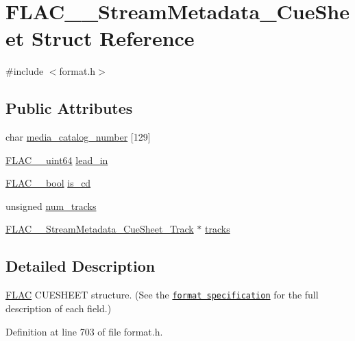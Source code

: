 \hypertarget{struct_f_l_a_c_____stream_metadata___cue_sheet}{}\section{F\+L\+A\+C\+\_\+\+\_\+\+Stream\+Metadata\+\_\+\+Cue\+Sheet Struct Reference}
\label{struct_f_l_a_c_____stream_metadata___cue_sheet}


{\ttfamily \#include $<$format.\+h$>$}

\subsection*{Public Attributes}
\begin{DoxyCompactItemize}
\item 
char \hyperlink{struct_f_l_a_c_____stream_metadata___cue_sheet_a776e6057ac7939fba52edecd44ec45bc}{media\+\_\+catalog\+\_\+number} \mbox{[}129\mbox{]}
\item 
\hyperlink{ordinals_8h_aa78c8c70a3eb8a58af7436f278acde8e}{F\+L\+A\+C\+\_\+\+\_\+uint64} \hyperlink{struct_f_l_a_c_____stream_metadata___cue_sheet_a43fdc0a538ef2c3e0926ee22814baf40}{lead\+\_\+in}
\item 
\hyperlink{ordinals_8h_a95103469f1cbd78b8cf250194985b34e}{F\+L\+A\+C\+\_\+\+\_\+bool} \hyperlink{struct_f_l_a_c_____stream_metadata___cue_sheet_a6af66f921aefc6f779fbc0ab6daeab8a}{is\+\_\+cd}
\item 
unsigned \hyperlink{struct_f_l_a_c_____stream_metadata___cue_sheet_a6924f26a8e8fa9023f23539b959fe2ae}{num\+\_\+tracks}
\item 
\hyperlink{struct_f_l_a_c_____stream_metadata___cue_sheet___track}{F\+L\+A\+C\+\_\+\+\_\+\+Stream\+Metadata\+\_\+\+Cue\+Sheet\+\_\+\+Track} $\ast$ \hyperlink{struct_f_l_a_c_____stream_metadata___cue_sheet_a5c0c3440b01b773684d56aeb1e424fab}{tracks}
\end{DoxyCompactItemize}


\subsection{Detailed Description}
\hyperlink{namespace_f_l_a_c}{F\+L\+AC} C\+U\+E\+S\+H\+E\+ET structure. (See the \href{../format.html#metadata_block_cuesheet}{\tt format specification} for the full description of each field.) 

Definition at line 703 of file format.\+h.



